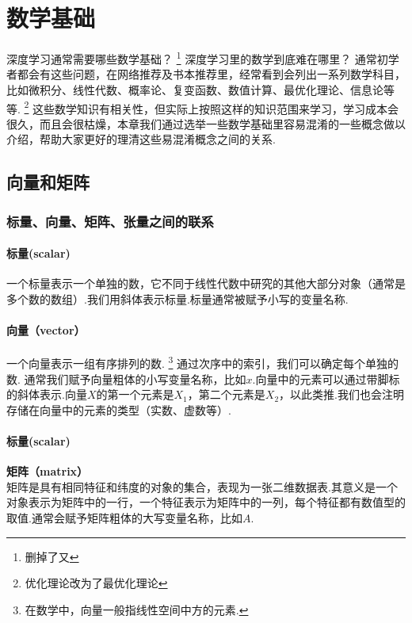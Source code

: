 \chapter{数学基础}
\label{ux7b2cux4e00ux7ae0-ux6570ux5b66ux57faux7840}
深度学习通常需要哪些数学基础？
\footnote{删掉了又}
深度学习里的数学到底难在哪里？
通常初学者都会有这些问题，在网络推荐及书本推荐里，经常看到会列出一系列数学科目，比如微积分、线性代数、概率论、复变函数、数值计算、最优化理论、信息论等等.
\footnote{优化理论改为了最优化理论}
这些数学知识有相关性，但实际上按照这样的知识范围来学习，学习成本会很久，而且会很枯燥，本章我们通过选举一些数学基础里容易混淆的一些概念做以介绍，帮助大家更好的理清这些易混淆概念之间的关系.

\section{ 向量和矩阵}
\label{ux5411ux91cfux548cux77e9ux9635}
\subsection{标量、向量、矩阵、张量之间的联系}
\label{ux6807ux91cfux5411ux91cfux77e9ux9635ux5f20ux91cfux4e4bux95f4ux7684ux8054ux7cfb}
\subsubsection{标量(scalar)}
\begin{defination}
一个标量表示一个单独的数，它不同于线性代数中研究的其他大部分对象（通常是多个数的数组）.我们用斜体表示标量.标量通常被赋予小写的变量名称.  
\end{defination}
\subsubsection{向量（vector）}
\begin{defination}
  一个向量表示一组有序排列的数.
  \footnote{在数学中，向量一般指线性空间中方的元素.}
  通过次序中的索引，我们可以确定每个单独的数.
  通常我们赋予向量粗体的小写变量名称，比如$x$.向量中的元素可以通过带脚标的斜体表示.向量\(X\)的第一个元素是\(X_1\)，第二个元素是\(X_2\)，以此类推.我们也会注明存储在向量中的元素的类型（实数、虚数等）.  
\end{defination}

\subsubsection{标量(scalar)}
\textbf{矩阵（matrix）}\\
​矩阵是具有相同特征和纬度的对象的集合，表现为一张二维数据表.其意义是一个对象表示为矩阵中的一行，一个特征表示为矩阵中的一列，每个特征都有数值型的取值.通常会赋予矩阵粗体的大写变量名称，比如\(A\).
